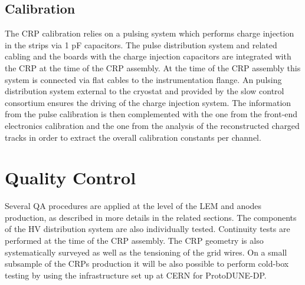 \subsection{Calibration}
\label{sec:fddp-crp-install-calib}

The CRP calibration relies on a pulsing system which performs charge injection in the strips via 1 pF capacitors. The pulse distribution system and related cabling and the boards with the charge injection capacitors are integrated  with the CRP at the time of the CRP assembly. At the time of the CRP assembly this system is connected via flat cables to the instrumentation flange. An pulsing distribution system external to the cryostat and  provided by the slow control consortium ensures the driving of the charge injection system.  The information from the pulse calibration is then complemented with the one from the front-end electronics calibration and the one from the analysis of the reconstructed charged tracks in order to extract the overall calibration constants per channel.


\section{Quality Control}
\label{sec:fddp-crp-qc}

Several QA procedures are applied at the level of the LEM and anodes production, as described in more details in the related sections. The components of the HV distribution system are also individually tested. Continuity tests are performed at the time of the CRP assembly. The CRP geometry is also systematically surveyed as well as the tensioning of the grid wires. On a small subsample of the CRPs production it will be also possible to perform cold-box testing by using the infrastructure set up at CERN for ProtoDUNE-DP.







